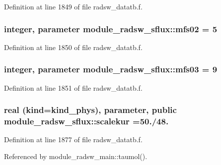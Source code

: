 Definition at line 1849 of file radsw\+\_\+datatb.\+f.

\subsubsection[{\texorpdfstring{mfs02}{mfs02}}]{\setlength{\rightskip}{0pt plus 5cm}integer, parameter module\+\_\+radsw\+\_\+sflux\+::mfs02 = 5}\hypertarget{namespacemodule__radsw__sflux_acca3bbc0dd125a3e8c3734c58c48e79b}{}\label{namespacemodule__radsw__sflux_acca3bbc0dd125a3e8c3734c58c48e79b}


Definition at line 1850 of file radsw\+\_\+datatb.\+f.

\subsubsection[{\texorpdfstring{mfs03}{mfs03}}]{\setlength{\rightskip}{0pt plus 5cm}integer, parameter module\+\_\+radsw\+\_\+sflux\+::mfs03 = 9}\hypertarget{namespacemodule__radsw__sflux_a5bd55a5106ce82bd47250d38d9b8f22a}{}\label{namespacemodule__radsw__sflux_a5bd55a5106ce82bd47250d38d9b8f22a}


Definition at line 1851 of file radsw\+\_\+datatb.\+f.

\subsubsection[{\texorpdfstring{scalekur}{scalekur}}]{\setlength{\rightskip}{0pt plus 5cm}real (kind=kind\+\_\+phys), parameter, public module\+\_\+radsw\+\_\+sflux\+::scalekur =50./48.}\hypertarget{namespacemodule__radsw__sflux_a2f3280a36f27cea89fc66d71e799cf6d}{}\label{namespacemodule__radsw__sflux_a2f3280a36f27cea89fc66d71e799cf6d}


Definition at line 1877 of file radsw\+\_\+datatb.\+f.



Referenced by module\+\_\+radsw\+\_\+main\+::taumol().

